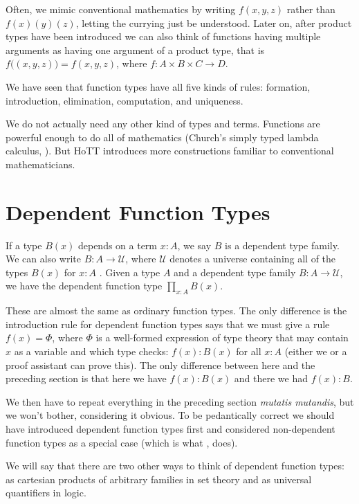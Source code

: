 \documentclass[11pt]{article}
\newcommand{\universe}{\mathcal{U}}
\begin{document}
Often, we mimic conventional mathematics by writing $f(x, y, z)$ rather
than $f(x)(y)(z)$, letting the currying just be understood.
Later on, after product types have been introduced we can also think of
functions having multiple arguments as having one argument of a product
type, that is $f\bigl((x, y, z)\bigr) = f(x, y, z)$,
where $f : A \times B \times C \to D$.

We have seen that function types have all five kinds of rules:
formation, introduction, elimination, computation, and uniqueness.

We do not actually need any other kind of types and terms.  Functions
are powerful enough to do all of mathematics (Church's simply typed
lambda calculus, ).  But HoTT introduces
more constructions familiar to conventional mathematicians.

\section{Dependent Function Types}
\label{sec:dependent-function-types}

If a type $B(x)$ depends on a term $x : A$, we say $B$ is a dependent
type family.  We can also write $B : A \to \universe$, where $\universe$ denotes
a universe containing all of the types $B(x)$ for $x : A$
.
Given a type $A$ and a dependent type family $B : A \to \universe$, we
have the dependent function type $\prod_{x : A} B(x)$.

These are almost the same as ordinary function types.
The only difference is the introduction rule for dependent function types
says that we must give a rule
$f(x) = \Phi$, where $\Phi$ is a well-formed expression of type theory
that may contain $x$ as a variable and which type checks: $f(x) : B(x)$
for all $x : A$ (either we or a proof assistant can prove this).
The only difference between here and the preceding section is that here
we have $f(x) : B(x)$ and there we had $f(x) : B$.

We then have to repeat everything in the preceding section
\emph{mutatis mutandis}, but we won't bother, considering it obvious.
To be pedantically correct we should have introduced dependent function
types first and considered non-dependent function types as a special case
(which is what , does).

We will say that there are two other ways to think of dependent function
types: as cartesian products of arbitrary families in set theory
and as universal quantifiers in logic.
\end{document}

